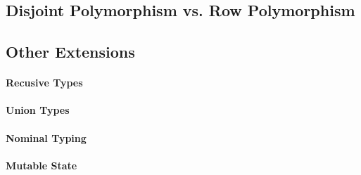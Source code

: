 \subsection{Disjoint Polymorphism vs. Row Polymorphism}



\subsection{Other Extensions}

\paragraph{Recusive Types}


\paragraph{Union Types}

\paragraph{Nominal Typing}


\paragraph{Mutable State}



